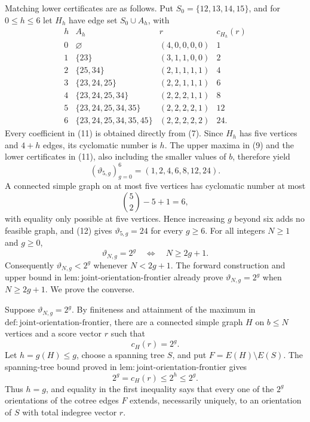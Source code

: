 Matching lower certificates are as follows.  Put \(S_0=\{12,13,14,15\}\), and for \(0\leq h\leq6\) let \(H_h\) have edge set \(S_0\cup A_h\), with
\[
\begin{array}{c|l|c|c}
h&A_h&r&c_{H_h}(r)\\ \hline
0&\varnothing&(4,0,0,0,0)&1\\
1&\{23\}&(3,1,1,0,0)&2\\
2&\{25,34\}&(2,1,1,1,1)&4\\
3&\{23,24,25\}&(2,2,1,1,1)&6\\
4&\{23,24,25,34\}&(2,2,2,1,1)&8\\
5&\{23,24,25,34,35\}&(2,2,2,2,1)&12\\
6&\{23,24,25,34,35,45\}&(2,2,2,2,2)&24.
\end{array}
\tag{11}
\]
Every coefficient in (11) is obtained directly from (7).  Since \(H_h\) has five vertices and \(4+h\) edges, its cyclomatic number is \(h\).  The upper maxima in (9) and the lower certificates in (11), also including the smaller values of \(b\), therefore yield
\[
 (\vartheta_{5,g})_{g=0}^{6}=(1,2,4,6,8,12,24).
\tag{12}
\]
A connected simple graph on at most five vertices has cyclomatic number at most
\[
 \binom52-5+1=6,
\tag{13}
\]
with equality only possible at five vertices.  Hence increasing \(g\) beyond six adds no feasible graph, and (12) gives \(\vartheta_{5,g}=24\) for every \(g\geq6\).
For all integers \(N\geq1\) and \(g\geq0\),
\[
 \vartheta_{N,g}=2^g
 \quad\Longleftrightarrow\quad
 N\geq2g+1.
\]
Consequently \(\vartheta_{N,g}<2^g\) whenever \(N<2g+1\).
The forward construction and upper bound in \(\mathrm{lem:joint\mbox{-}orientation\mbox{-}frontier}\) already prove \(\vartheta_{N,g}=2^g\) when \(N\geq2g+1\).  We prove the converse.

Suppose \(\vartheta_{N,g}=2^g\).  By finiteness and attainment of the maximum in \(\mathrm{def:joint\mbox{-}orientation\mbox{-}frontier}\), there are a connected simple graph \(H\) on \(b\leq N\) vertices and a score vector \(r\) such that
\[
 c_H(r)=2^g.
\tag{14}
\]
Let \(h=g(H)\leq g\), choose a spanning tree \(S\), and put \(F=E(H)\setminus E(S)\).  The spanning-tree bound proved in \(\mathrm{lem:joint\mbox{-}orientation\mbox{-}frontier}\) gives
\[
 2^g=c_H(r)\leq2^h\leq2^g.
\tag{15}
\]
Thus \(h=g\), and equality in the first inequality says that every one of the \(2^g\) orientations of the cotree edges \(F\) extends, necessarily uniquely, to an orientation of \(S\) with total indegree vector \(r\).

